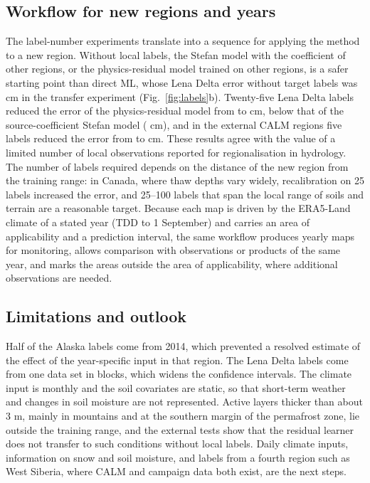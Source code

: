 \subsection{Workflow for new regions and years}
The label-number experiments translate into a sequence for applying the method to a new region. Without local labels, the Stefan model with the coefficient of other regions, or the physics-residual model trained on other regions, is a safer starting point than direct ML, whose Lena Delta error without target labels was \ntlrmseLeDszero{} cm in the transfer experiment (Fig.~\ref{fig:labels}b). Twenty-five Lena Delta labels reduced the error of the physics-residual model from \ntlrmseLeRszero{} to \ntlrmseLeRstwfive{} cm, below that of the source-coefficient Stefan model (\ntlrmseLePzzero{} cm), and in the external CALM regions five labels reduced the error from \nftAllRszero{} to \nftAllRsfive{} cm. These results agree with the value of a limited number of local observations reported for regionalisation in hydrology\cite{Pool2019}. The number of labels required depends on the distance of the new region from the training range: in Canada, where thaw depths vary widely, recalibration on 25 labels increased the error, and 25--100 labels that span the local range of soils and terrain are a reasonable target. Because each map is driven by the ERA5-Land climate of a stated year (TDD to 1 September) and carries an area of applicability and a prediction interval, the same workflow produces yearly maps for monitoring, allows comparison with observations or products of the same year, and marks the areas outside the area of applicability, where additional observations are needed.

\subsection{Limitations and outlook}
Half of the Alaska labels come from 2014, which prevented a resolved estimate of the effect of the year-specific input in that region. The Lena Delta labels come from one data set in \nnblkLe{} blocks, which widens the confidence intervals. The climate input is monthly and the soil covariates are static, so that short-term weather and changes in soil moisture are not represented. Active layers thicker than about 3 m, mainly in mountains and at the southern margin of the permafrost zone, lie outside the training range, and the external tests show that the residual learner does not transfer to such conditions without local labels. Daily climate inputs, information on snow and soil moisture, and labels from a fourth region such as West Siberia, where CALM and campaign data both exist, are the next steps.
